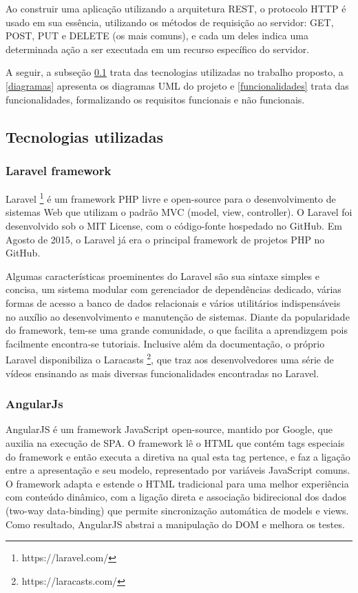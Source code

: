Ao construir uma aplicação utilizando a arquitetura REST, o protocolo HTTP é usado em sua essência, utilizando os métodos de requisição ao servidor: GET, POST, PUT e DELETE (os mais comuns), e cada um deles indica uma determinada ação a ser executada em um recurso específico do servidor.


A seguir, a subseção \ref{tecnologias} trata das tecnologias utilizadas no trabalho proposto, a \ref{diagramas} apresenta os diagramas UML do projeto e \ref{funcionalidades} trata das funcionalidades, formalizando os requisitos funcionais e não funcionais.


\subsection{Tecnologias utilizadas}\label{tecnologias}


\subsubsection{Laravel framework}


Laravel \footnote{https://laravel.com/} é um framework PHP livre e open-source para o desenvolvimento de sistemas Web que utilizam o padrão MVC (model, view, controller). O Laravel foi desenvolvido sob o MIT License, com o código-fonte hospedado no GitHub. Em Agosto de 2015, o Laravel já era o principal framework de projetos PHP no GitHub. 


Algumas características proeminentes do Laravel são sua sintaxe simples e concisa, um sistema modular com gerenciador de dependências dedicado, várias formas de acesso a banco de dados relacionais e vários utilitários indispensáveis no auxílio ao desenvolvimento e manutenção de sistemas. Diante da popularidade do framework, tem-se uma grande comunidade, o que facilita a aprendizgem pois facilmente encontra-se tutoriais. Inclusive além da documentação, o próprio Laravel disponibiliza o Laracasts \footnote{https://laracasts.com/}, que traz aos desenvolvedores uma série de vídeos ensinando as mais diversas funcionalidades encontradas no Laravel.


\subsubsection{AngularJs}


AngularJS é um framework JavaScript open-source, mantido por Google, que auxilia na execução de SPA. O framework lê o HTML que contém tags especiais do framework e então executa a diretiva na qual esta tag pertence, e faz a ligação entre a apresentação e seu modelo, representado por variáveis JavaScript comuns. O framework adapta e estende o HTML tradicional para uma melhor experiência com conteúdo dinâmico, com a ligação direta e associação bidirecional dos dados (two-way data-binding) que permite sincronização automática de models e views. Como resultado, AngularJS abstrai a manipulação do DOM e melhora os testes.


